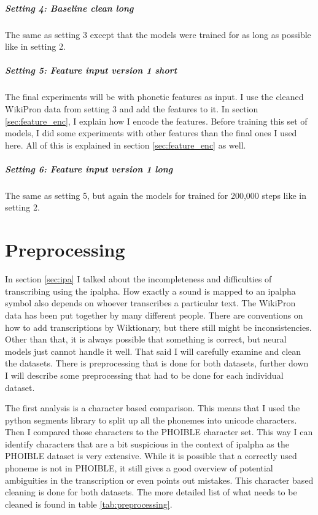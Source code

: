 \subparagraph{Setting 4: Baseline clean long}
The same as setting 3 except that the models were trained for as long as possible like in setting 2.

\subparagraph{Setting 5: Feature input version 1 short}
The final experiments will be with phonetic features as input. I use the cleaned WikiPron data from setting 3 and add the features to it. In section \ref{sec:feature_enc}, I explain how I encode the features. Before training this set of models, I did some experiments with other features than the final ones I used here. All of this is explained in section \ref{sec:feature_enc} as well.

\subparagraph{Setting 6: Feature input version 1 long}
The same as setting 5, but again the models for trained for 200,000 steps like in setting 2.

\section{Preprocessing}
\label{preprocess}
In section \ref{sec:ipa} I talked about the incompleteness and difficulties of transcribing using the \ac{ipalpha}. How exactly a sound is mapped to an \ac{ipalpha} symbol also depends on whoever transcribes a particular text. The WikiPron data has been put together by many different people. There are conventions on how to add transcriptions by Wiktionary, but there still might be inconsistencies. Other than that, it is always possible that something is correct, but neural models just cannot handle it well. That said I will carefully examine and clean the datasets. There is preprocessing that is done for both datasets, further down I will describe some preprocessing that had to be done for each individual dataset.

The first analysis is a character based comparison. This means that I used the python segments library to split up all the phonemes into unicode characters. Then I compared those characters to the PHOIBLE character set. This way I can identify characters that are a bit suspicious in the context of \ac{ipalpha} as the PHOIBLE dataset is very extensive. While it is possible that a correctly used phoneme is not in PHOIBLE, it still gives a good overview of potential ambiguities in the transcription or even points out mistakes. This character based cleaning is done for both datasets. The more detailed list of what needs to be cleaned is found in table \ref{tab:preprocessing}.


